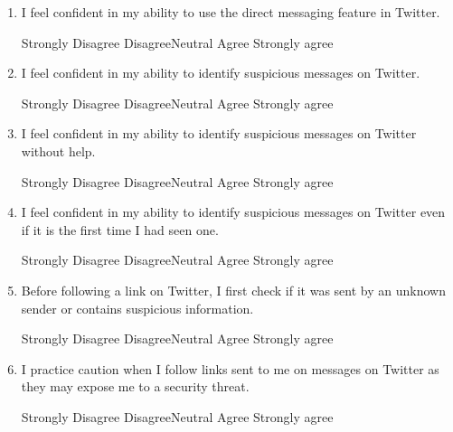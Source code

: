 \documentclass[doctor]{thesis} %
\theoremstyle{plain}
\begin{document}
\begin{enumerate}[noitemsep]
\item I feel confident in my ability to use the direct messaging feature in Twitter.
\par Strongly Disagree \hspace{1cm} Disagree\hspace{1cm}Neutral\hspace{1cm} Agree\hspace{1cm} Strongly agree
\item I feel confident in my ability to identify suspicious messages on Twitter.
\par Strongly Disagree \hspace{1cm} Disagree\hspace{1cm}Neutral\hspace{1cm} Agree\hspace{1cm} Strongly agree
\item I feel confident in my ability to identify suspicious messages on Twitter without help.
\par Strongly Disagree \hspace{1cm} Disagree\hspace{1cm}Neutral\hspace{1cm} Agree\hspace{1cm} Strongly agree
\item I feel confident in my ability to identify suspicious messages on Twitter even if it is the first time I had seen one.
\par Strongly Disagree \hspace{1cm} Disagree\hspace{1cm}Neutral\hspace{1cm} Agree\hspace{1cm} Strongly agree
\item Before following a link on Twitter, I first check if it was sent by an unknown sender or contains suspicious information.
\par Strongly Disagree \hspace{1cm} Disagree\hspace{1cm}Neutral\hspace{1cm} Agree\hspace{1cm} Strongly agree
\item I practice caution when I follow links sent to me on messages on Twitter as they may expose me to a security threat.
\par Strongly Disagree \hspace{1cm} Disagree\hspace{1cm}Neutral\hspace{1cm} Agree\hspace{1cm} Strongly agree

\end{enumerate}
\end{document}

